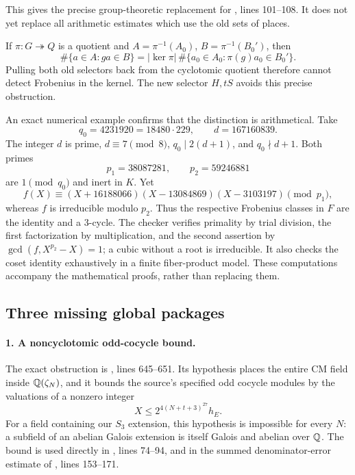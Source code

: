This gives the precise group-theoretic replacement for
,
lines 101--108. It does not yet replace all arithmetic estimates
which use the old sets of places.

\begin{remark}
If $\pi:G\twoheadrightarrow Q$ is a quotient and
$A=\pi^{-1}(A_0)$, $B=\pi^{-1}(B_0')$, then
\[
 \#\{a\in A:ga\in B\}
 =|\ker\pi|\,\#\{a_0\in A_0:\pi(g)a_0\in B_0'\}.
\]
Pulling both old selectors back from the cyclotomic quotient
therefore cannot detect Frobenius in the kernel. The new selector
$H,tS$ avoids this precise obstruction.
\end{remark}

An exact numerical example confirms that the distinction is
arithmetical. Take
\[
 q_0=4231920=18480\cdot229,\qquad d=167160839.
\]
The integer $d$ is prime, $d\equiv7\pmod8$,
$q_0\mid2(d+1)$, and $q_0\nmid d+1$. Both primes
\[
 p_1=38087281,\qquad p_2=59246881
\]
are $1\pmod{q_0}$ and inert in $K$. Yet
\[
 f(X)\equiv(X+16188066)(X-13084869)(X-3103197)\pmod {p_1},
\]
whereas $f$ is irreducible modulo $p_2$. Thus the respective
Frobenius classes in $F$ are the identity and a 3-cycle. The
checker verifies primality by trial division, the first
factorization by multiplication, and the second assertion by
$\gcd(f,X^{p_2}-X)=1$; a cubic without a root is irreducible.
It also checks the coset identity exhaustively in a finite
fiber-product model. These computations accompany the mathematical
proofs, rather than replacing them.

\subsection{Three missing global packages}

\paragraph{1. A noncyclotomic odd-cocycle bound.}
The exact obstruction is
,
lines 645--651. Its hypothesis places the entire CM field inside
$\mathbb Q(\zeta_N)$, and it bounds the source's specified odd cocycle
modules by the valuations of a nonzero integer
\[
 X\le2^{4(N+t+3)^{27}}h_E.
\]
For a field containing our $S_3$ extension, this hypothesis is
impossible for every $N$: a subfield of an abelian Galois extension
is itself Galois and abelian over $\mathbb Q$. The bound is used directly in
,
lines 74--94, and in the summed denominator-error estimate of
,
lines 153--171.

